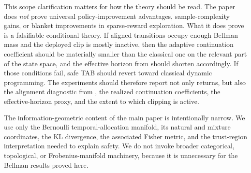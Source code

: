 \documentclass{article}
\theoremstyle{remark}
\begin{document}
This scope clarification matters for how the theory should be read. The paper does \emph{not} prove universal policy-improvement advantages, sample-complexity gains, or blanket improvements in sparse-reward exploration. What it does prove is a falsifiable conditional theory. If aligned transitions occupy enough Bellman mass and the deployed clip is mostly inactive, then the adaptive continuation coefficient should be materially smaller than the classical one on the relevant part of the state space, and the effective horizon from  should shorten accordingly. If those conditions fail, safe TAB should revert toward classical dynamic programming. The experiments should therefore report not only returns, but also the alignment diagnostic from , the realized continuation coefficients, the effective-horizon proxy, and the extent to which clipping is active.

The information-geometric content of the main paper is intentionally narrow. We use only the Bernoulli temporal-allocation manifold, its natural and mixture coordinates, the KL divergence, the associated Fisher metric, and the trust-region interpretation needed to explain safety. We do not invoke broader categorical, topological, or Frobenius-manifold machinery, because it is unnecessary for the Bellman results proved here.
\end{document}

